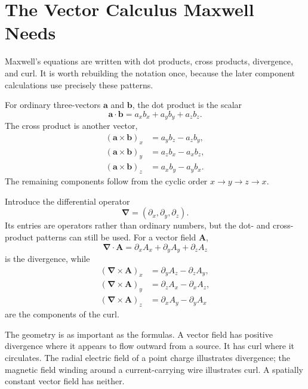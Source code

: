 \section{The Vector Calculus Maxwell Needs}

Maxwell's equations are written with dot products, cross products, divergence, and curl. It is worth rebuilding the notation once, because the later component calculations use precisely these patterns.

For ordinary three-vectors \(\mathbf a\) and \(\mathbf b\), the dot product is the scalar
\begin{equation}
\mathbf a\cdot\mathbf b
=a_xb_x+a_yb_y+a_zb_z.
\end{equation}
The cross product is another vector,
\begin{align}
(\mathbf a\times\mathbf b)_x&=a_yb_z-a_zb_y,\\
(\mathbf a\times\mathbf b)_y&=a_zb_x-a_xb_z,\\
(\mathbf a\times\mathbf b)_z&=a_xb_y-a_yb_x.
\end{align}
The remaining components follow from the cyclic order \(x\to y\to z\to x\).

Introduce the differential operator
\begin{equation}
\boldsymbol\nabla=
\left(\partial_x,\partial_y,\partial_z\right).
\end{equation}
Its entries are operators rather than ordinary numbers, but the dot- and cross-product patterns can still be used. For a vector field \(\mathbf A\),
\begin{equation}
\boldsymbol\nabla\cdot\mathbf A
=\partial_xA_x+\partial_yA_y+\partial_zA_z
\label{eq:divergence}
\end{equation}
is the divergence, while
\begin{align}
(\boldsymbol\nabla\times\mathbf A)_x
 &=\partial_yA_z-\partial_zA_y,\\
(\boldsymbol\nabla\times\mathbf A)_y
 &=\partial_zA_x-\partial_xA_z,\\
(\boldsymbol\nabla\times\mathbf A)_z
 &=\partial_xA_y-\partial_yA_x
\label{eq:curl}
\end{align}
are the components of the curl.

The geometry is as important as the formulas. A vector field has positive divergence where it appears to flow outward from a source. It has curl where it circulates. The radial electric field of a point charge illustrates divergence; the magnetic field winding around a current-carrying wire illustrates curl. A spatially constant vector field has neither.

